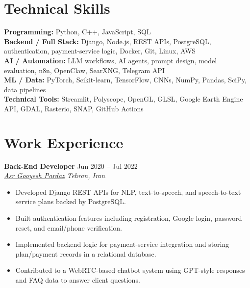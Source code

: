 \documentclass[a4paper,10pt]{article}
\newcommand{\resumeSubheading}[4]{
    \textbf{#1} \hfill #2 \\
    \textit{#3} \hfill \textit{#4}
}
\begin{document}
\section*{Technical Skills}

\textbf{Programming:} Python, C++, JavaScript, SQL \\
\textbf{Backend / Full Stack:} Django, Node.js, REST APIs, PostgreSQL, authentication, payment-service logic, Docker, Git, Linux, AWS \\
\textbf{AI / Automation:} LLM workflows, AI agents, prompt design, model evaluation, n8n, OpenClaw, SearXNG, Telegram API \\
\textbf{ML / Data:} PyTorch, Scikit-learn, TensorFlow, CNNs, NumPy, Pandas, SciPy, data pipelines \\
\textbf{Technical Tools:} Streamlit, Polyscope, OpenGL, GLSL, Google Earth Engine API, GDAL, Rasterio, SNAP, GitHub Actions


\section*{Work Experience}

\resumeSubheading
{Back-End Developer}
{Jun 2020 -- Jul 2022}
{\href{https://asr-gooyesh.com/en/}{Asr Gooyesh Pardaz}}
{Tehran, Iran}
\begin{itemize}[leftmargin=0.25in]
    \item Developed Django REST APIs for NLP, text-to-speech, and speech-to-text service plans backed by PostgreSQL.
    \item Built authentication features including registration, Google login, password reset, and email/phone verification.
    \item Implemented backend logic for payment-service integration and storing plan/payment records in a relational database.
    \item Contributed to a WebRTC-based chatbot system using GPT-style responses and FAQ data to answer client questions.
\end{itemize}
\end{document}
